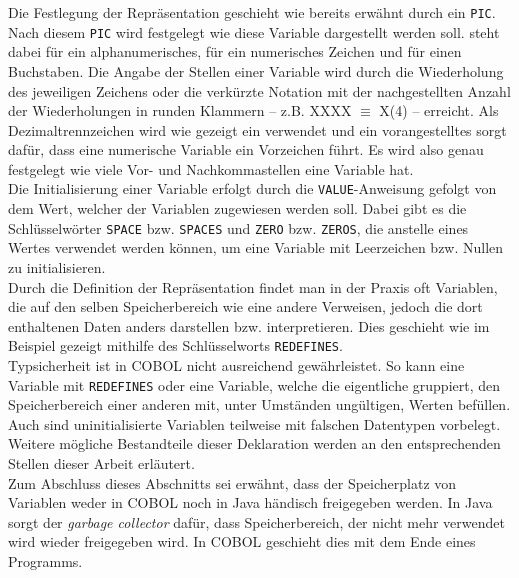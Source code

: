 Die Festlegung der Repräsentation geschieht wie bereits erwähnt durch ein \texttt{PIC}. Nach diesem \texttt{PIC} wird festgelegt wie diese Variable dargestellt werden soll.  steht dabei für ein alphanumerisches,  für ein numerisches Zeichen und  für einen Buchstaben. Die Angabe der Stellen einer Variable wird durch die Wiederholung des jeweiligen Zeichens oder die verkürzte Notation mit der nachgestellten Anzahl der Wiederholungen in runden Klammern -- z.B. XXXX $\equiv$ X(4) -- erreicht. Als Dezimaltrennzeichen wird wie gezeigt ein  verwendet und ein vorangestelltes  sorgt dafür, dass eine numerische Variable ein Vorzeichen führt. Es wird also genau festgelegt wie viele Vor- und Nachkommastellen eine Variable hat.\\

Die Initialisierung einer Variable erfolgt durch die \texttt{VALUE}-Anweisung gefolgt von dem Wert, welcher der Variablen zugewiesen werden soll. Dabei gibt es die Schlüsselwörter \texttt{SPACE} bzw. \texttt{SPACES} und \texttt{ZERO} bzw. \texttt{ZEROS}, die anstelle eines Wertes verwendet werden können, um eine Variable mit Leerzeichen bzw. Nullen zu initialisieren.\\

Durch die Definition der Repräsentation findet man in der Praxis oft Variablen, die auf den selben Speicherbereich wie eine andere Verweisen, jedoch die dort enthaltenen Daten anders darstellen bzw. interpretieren. Dies geschieht wie im Beispiel gezeigt mithilfe des Schlüsselworts \texttt{REDEFINES}.\\

Typsicherheit ist in COBOL nicht ausreichend gewährleistet. So kann eine Variable mit \texttt{REDEFINES} oder eine Variable, welche die eigentliche gruppiert, den Speicherbereich einer anderen mit, unter Umständen ungültigen, Werten befüllen. Auch sind uninitialisierte Variablen teilweise mit falschen Datentypen vorbelegt. \\

Weitere mögliche Bestandteile dieser Deklaration werden an den entsprechenden Stellen dieser Arbeit erläutert.\\

Zum Abschluss dieses Abschnitts sei erwähnt, dass der Speicherplatz von Variablen weder in COBOL noch in Java händisch freigegeben werden. In Java sorgt der \textit{garbage collector} dafür, dass Speicherbereich, der nicht mehr verwendet wird wieder freigegeben wird. In COBOL geschieht dies mit dem Ende eines Programms.\\